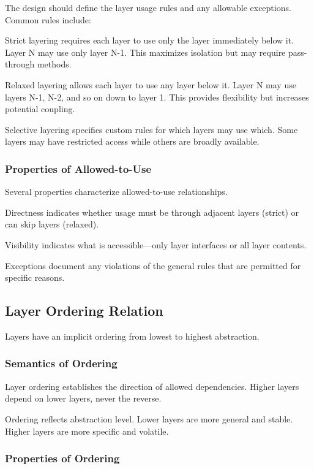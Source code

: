 \documentclass[11pt]{article}
\begin{document}
The design should define the layer usage rules and any allowable exceptions. Common rules include:

Strict layering requires each layer to use only the layer immediately below it. Layer N may use only layer N-1. This maximizes isolation but may require pass-through methods.

Relaxed layering allows each layer to use any layer below it. Layer N may use layers N-1, N-2, and so on down to layer 1. This provides flexibility but increases potential coupling.

Selective layering specifies custom rules for which layers may use which. Some layers may have restricted access while others are broadly available.

\subsubsection{Properties of Allowed-to-Use}

Several properties characterize allowed-to-use relationships.

Directness indicates whether usage must be through adjacent layers (strict) or can skip layers (relaxed).

Visibility indicates what is accessible---only layer interfaces or all layer contents.

Exceptions document any violations of the general rules that are permitted for specific reasons.

\subsection{Layer Ordering Relation}

Layers have an implicit ordering from lowest to highest abstraction.

\subsubsection{Semantics of Ordering}

Layer ordering establishes the direction of allowed dependencies. Higher layers depend on lower layers, never the reverse.

Ordering reflects abstraction level. Lower layers are more general and stable. Higher layers are more specific and volatile.

\subsubsection{Properties of Ordering}
\end{document}
